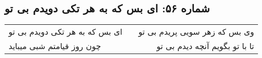 \begin{center}
\section*{شماره ۵۶: ای بس که به هر تکی دویدم بی تو}
\label{sec:056}
\begin{longtable}{l p{0.5cm} r}
ای بس که به هر تکی دویدم بی تو
&&
وی بس که زهر سویی پریدم بی تو
\\
چون روز قیامتم شبی میباید
&&
تا با تو بگویم آنچه دیدم بی تو
\\
\end{longtable}
\end{center}
